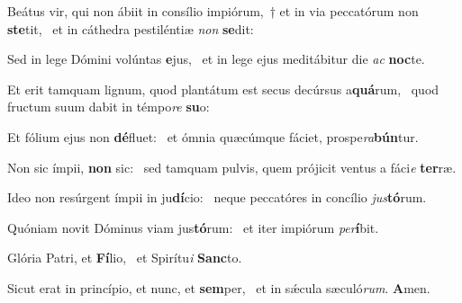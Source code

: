 \item Beátus vir, qui non ábiit in consílio impiórum,~† et in via peccatórum non \textbf{ste}tit,~\psstar{} et in cáthedra pestiléntiæ \textit{non} \textbf{se}dit:
\item Sed in lege Dómini volúntas \textbf{e}jus,~\psstar{} et in lege ejus meditábitur die \textit{ac} \textbf{noc}te.
\item Et erit tamquam lignum, quod plantátum est secus decúrsus a\textbf{quá}rum,~\psstar{} quod fructum suum dabit in témpo\textit{re} \textbf{su}o:
\item Et fólium ejus non \textbf{dé}fluet:~\psstar{} et ómnia quæcúmque fáciet, prospe\textit{ra}\textbf{bún}tur.
\item Non sic ímpii, \textbf{non} sic:~\psstar{} sed tamquam pulvis, quem prójicit ventus a fáci\textit{e} \textbf{ter}ræ.
\item Ideo non resúrgent ímpii in ju\textbf{dí}cio:~\psstar{} neque peccatóres in concílio \textit{jus}\textbf{tó}rum.
\item Quóniam novit Dóminus viam jus\textbf{tó}rum:~\psstar{} et iter impiórum \textit{per}\textbf{í}bit.
\item Glória Patri, et \textbf{Fí}lio,~\psstar{} et Spirítu\textit{i} \textbf{Sanc}to.
\item Sicut erat in princípio, et nunc, et \textbf{sem}per,~\psstar{} et in sǽcula sæculó\textit{rum}. \textbf{A}men.
